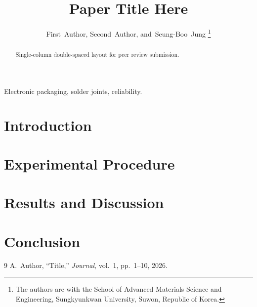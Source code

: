 \documentclass[peerreview]{IEEEtran}
\begin{document}
\title{Paper Title Here}

\author{First~Author,
        Second~Author,
        and~Seung-Boo~Jung%
\thanks{The authors are with the School of Advanced Materials Science and
Engineering, Sungkyunkwan University, Suwon, Republic of Korea.}}

\maketitle

\begin{abstract}
Single-column double-spaced layout for peer review submission.
\end{abstract}

\begin{IEEEkeywords}
Electronic packaging, solder joints, reliability.
\end{IEEEkeywords}

\section{Introduction}

\section{Experimental Procedure}

\section{Results and Discussion}

\section{Conclusion}

\begin{thebibliography}{9}
 A.~Author, ``Title,'' \emph{Journal}, vol.~1, pp.~1--10, 2026.
\end{thebibliography}
\end{document}

